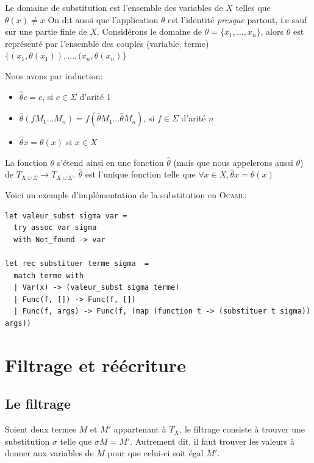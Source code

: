 Le domaine de substitution est l'ensemble des variables de $X$ telles que $\theta (x) \neq x$
On dit aussi que l'application $\theta$ est l'identité \textit{presque} partout, i.e sauf sur une partie finie
de $X$.
Considérons le domaine de $\theta = \{x_1, ..., x_n\}$, alors $\theta$ est représenté par l'ensemble
des couples (variable, terme) $\{(x_1, \theta (x_1)), ...,(x_n, \theta (x_n) \} $

Nous avons par induction:
\begin{itemize}
	\item $\hat{\theta} c = c$, si $c \in \Sigma$ d'arité 1
	\item $\hat{\theta} (f M_1 \dots M_n) = f(\hat{\theta} M_1 \dots \hat{\theta} M_n )$, si $f \in \Sigma$ d'arité $n$ 
	\item $\hat{\theta} x = \theta (x)$ si $x \in X$
\end{itemize}
La fonction  $\theta$ s'étend ainsi en une fonction $\hat{\theta}$ (mais que nous appelerons aussi $\theta$)
 de  $T_{X \cup \Sigma} \rightarrow T_{X \cup \Sigma} $.
$\hat{\theta}$ est l'unique fonction telle que $\forall x \in X, \hat{\theta}x = \theta (x)$
\begin{center}
\end{center}

Voici un exemple d'implémentation de la substitution en \textsc{Ocaml}:
\begin{verbatim}
let valeur_subst sigma var =
  try assoc var sigma
  with Not_found -> var

let rec substituer terme sigma  =
  match terme with
  | Var(x) -> (valeur_subst sigma terme)
  | Func(f, []) -> Func(f, []) 
  | Func(f, args) -> Func(f, (map (function t -> (substituer t sigma)) args))
\end{verbatim}

\section{Filtrage et réécriture}
\subsection{Le filtrage}
Soient deux termes $M$ et $M'$ appartenant à $T_X$, le filtrage consiste à trouver une substitution $\sigma$
telle que $\sigma M = M'$. Autrement dit, il faut trouver les valeurs à donner aux variables de $M$ pour que celui-ci
soit égal $M'$.

